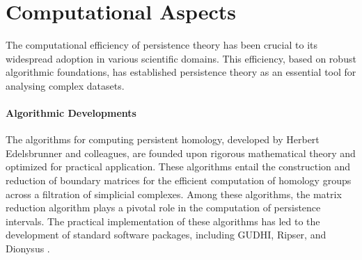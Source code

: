 \section{Computational Aspects}
The computational efficiency of persistence theory has been crucial to its widespread adoption in various scientific domains. This efficiency, based on robust algorithmic foundations, has established persistence theory as an essential tool for analysing complex datasets.

\paragraph*{Algorithmic Developments}
The algorithms for computing persistent homology, developed by Herbert Edelsbrunner and colleagues, are founded upon rigorous mathematical theory and optimized for practical application. These algorithms entail the construction and reduction of boundary matrices for the efficient computation of homology groups across a filtration of simplicial complexes. Among these algorithms, the matrix reduction algorithm plays a pivotal role in the computation of persistence intervals. The practical implementation of these algorithms has led to the development of standard software packages, including GUDHI, Ripser, and Dionysus \cite{Otter2017}.

